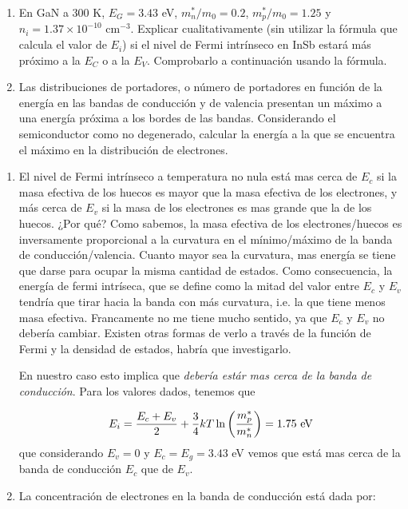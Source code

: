 \begin{texercise}
	\begin{enumerate}[label=\alph*)]
		\item En GaN a 300 K, $E_G = 3.43$ eV, $m_n^*/m_0 = 0.2$, $m_p^*/m_0 = 1.25$ y $n_i = 1.37 \times 10^{-10} \text{ cm}^{-3}$. Explicar cualitativamente (sin utilizar la fórmula que calcula el valor de $E_i$) si el nivel de Fermi intrínseco en InSb estará más próximo a la $E_C$ o a la $E_V$. Comprobarlo a continuación usando la fórmula.

		\item Las distribuciones de portadores, o número de portadores en función de la energía en las bandas de conducción y de valencia presentan un máximo a una energía próxima a los bordes de las bandas. Considerando el semiconductor como no degenerado, calcular la energía a la que se encuentra el máximo en la distribución de electrones.
	\end{enumerate}
	\tcblower
	\begin{enumerate}[label=\alph*)]
		\item El nivel de Fermi intrínseco a temperatura no nula está mas cerca de $E_c$ si la masa efectiva de los huecos es mayor que la masa efectiva de los electrones, y más cerca de $E_v$ si la masa de los electrones es mas grande que la de los huecos. ¿Por qué? Como sabemos, la masa efectiva de los electrones/huecos es inversamente proporcional a la curvatura en el mínimo/máximo de la banda de conducción/valencia. Cuanto mayor sea la curvatura, mas energía se tiene que darse para ocupar la misma cantidad de estados. Como consecuencia, la energía de fermi intríseca, que se define como la mitad del valor entre $E_c$ y $E_v$ tendría que tirar hacia la banda con más curvatura, i.e. la que tiene menos masa efectiva. \textcolor{BrickRed}{Francamente no me tiene mucho sentido, ya que $E_c$ y $E_v$ no debería cambiar. Existen otras formas de verlo a través de la función de Fermi y la densidad de estados, habría que investigarlo.}

		En nuestro caso esto implica que \textit{debería estár mas cerca de la banda de conducción}. Para los valores dados, tenemos que

		\begin{equation}
		      E_i = \frac{E_c+E_v}{2} + \frac{3}{4} kT \ln\left( \frac{m_p^*}{m_n^*} \right) = 1.75 \ \text{eV}
		\end{equation}
		que considerando $E_v=0$ y $E_c=E_g=3.43$ eV vemos que está mas cerca de la banda de conducción $E_c$ que de $E_v$.
		\item La concentración de electrones en la banda de conducción está dada por:


\end{enumerate}
\end{texercise}
